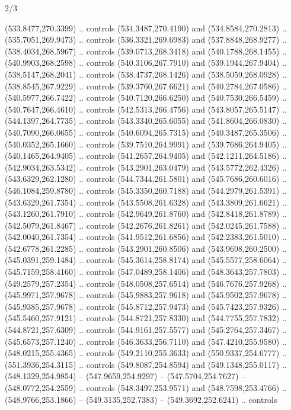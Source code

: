 \begin{flagdescription}{2/3}
\begin{scope}[xshift=0.5\flaglength,yshift=0.5\flagwidth,scale=\flagwidth/495.65]
\begin{scope}[y=0.8pt, x=0.8pt, yscale=-1,shift={(-463.76,-309.78)}]
  (533.8477,270.3399) .. controls (534.3487,270.4190) and (534.8584,270.2813) ..
  (535.7051,269.9473) .. controls (536.3321,269.6983) and (537.8848,268.9277) ..
  (538.4034,268.5967) .. controls (539.0713,268.3418) and (540.1788,268.1455) ..
  (540.9903,268.2598) .. controls (540.3106,267.7910) and (539.1944,267.9404) ..
  (538.5147,268.2041) .. controls (538.4737,268.1426) and (538.5059,268.0928) ..
  (538.8545,267.9229) .. controls (539.3760,267.6621) and (540.2784,267.0586) ..
  (540.5977,266.7422) .. controls (540.7120,266.6250) and (540.7530,266.5459) ..
  (540.7647,266.4610) .. controls (542.5313,266.4756) and (543.8057,265.5147) ..
  (544.1397,264.7735) .. controls (543.3340,265.6055) and (541.8604,266.0830) ..
  (540.7090,266.0655) .. controls (540.6094,265.7315) and (540.3487,265.3506) ..
  (540.0352,265.1660) .. controls (539.7510,264.9991) and (539.7686,264.9405) ..
  (540.1465,264.9405) .. controls (541.2657,264.9405) and (542.1211,264.5186) ..
  (542.9034,263.5342) .. controls (543.2901,263.0479) and (543.5772,262.4326) ..
  (543.6329,262.1280) .. controls (544.7344,261.5801) and (545.7686,260.6016) ..
  (546.1084,259.8780) .. controls (545.3350,260.7188) and (544.2979,261.5391) ..
  (543.6329,261.7354) .. controls (543.5508,261.6328) and (543.3809,261.6621) ..
  (543.1260,261.7910) .. controls (542.9649,261.8760) and (542.8418,261.8789) ..
  (542.5079,261.8467) .. controls (542.2676,261.8261) and (542.0245,261.7588) ..
  (542.0040,261.7354) .. controls (541.9512,261.6856) and (542.2383,261.5010) ..
  (542.6778,261.2285) .. controls (543.2901,260.8506) and (543.9698,260.2500) ..
  (545.0391,259.1484) .. controls (545.3614,258.8174) and (545.5577,258.6064) ..
  (545.7159,258.4160) .. controls (547.0489,258.1406) and (548.3643,257.7803) ..
  (549.2579,257.2354) .. controls (548.0508,257.6514) and (546.7676,257.9268) ..
  (545.9971,257.9678) .. controls (545.9883,257.9618) and (545.9502,257.9678) ..
  (545.9385,257.9678) .. controls (545.8712,257.9473) and (545.7423,257.9326) ..
  (545.5460,257.9121) .. controls (544.8721,257.8330) and (544.7755,257.7832) ..
  (544.8721,257.6309) .. controls (544.9161,257.5577) and (545.2764,257.3467) ..
  (545.6573,257.1240) .. controls (546.3633,256.7110) and (547.4210,255.9580) ..
  (548.0215,255.4365) .. controls (549.2110,255.3633) and (550.9337,254.6777) ..
  (551.3936,254.3115) .. controls (549.8087,254.8594) and (549.1348,255.0117) ..
  (548.1329,254.9854) -- (547.9659,254.9297) -- (547.5704,254.7627) --
  (548.0772,254.2559) .. controls (548.3497,253.9571) and (548.7598,253.4766) ..
  (548.9766,253.1866) -- (549.3135,252.7383) -- (549.3692,252.6241) .. controls

\end{scope}
\end{scope}
\end{flagdescription}
